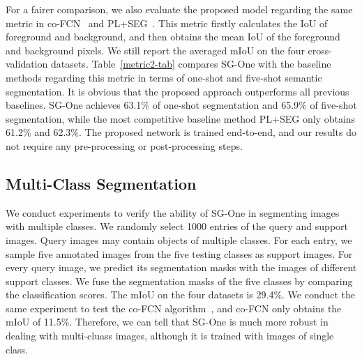\documentclass[journal]{IEEEtran}
\begin{document}
For a fairer comparison, we also evaluate the proposed model regarding the same metric in co-FCN~\cite{rakelly2018conditional} and PL+SEG~\cite{dong2018few}.
This metric firstly calculates the IoU of foreground and background, and then obtains the mean IoU of the foreground and background pixels.
We still report the averaged mIoU on the four cross-validation datasets.
Table~\ref{metric2-tab} compares SG-One with the baseline methods regarding this metric in terms of one-shot and five-shot semantic segmentation.
It is obvious that the proposed approach outperforms all previous baselines.
SG-One achieves 63.1\% of one-shot segmentation and 65.9\% of five-shot segmentation, while the most competitive baseline method PL+SEG only obtains 61.2\% and 62.3\%.
The proposed network is trained end-to-end, and our results do not require any pre-processing or post-processing steps. 

\vspace{-20pt}
\subsection{Multi-Class Segmentation}
We conduct experiments to verify the ability of SG-One in segmenting images with multiple classes.
We randomly select 1000 entries of the query and support images.
Query images may contain objects of multiple classes.
For each entry, we sample five annotated images from the five testing classes as support images.
For every query image, we predict its segmentation masks with the images of different support classes.
We fuse the segmentation masks of the five classes by comparing the classification scores.
The mIoU on the four datasets is 29.4\%.
We conduct the same experiment to test the co-FCN algorithm~\cite{rakelly2018conditional}, and co-FCN only obtains the mIoU of 11.5\%.
Therefore, we can tell that SG-One is much more robust in dealing with multi-cluass images, although it is trained with images of single class.
\end{document}
